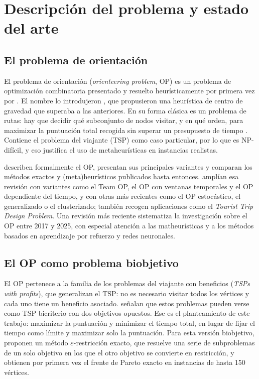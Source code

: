 \section{Descripción del problema y estado del arte}
\label{sec:estado_arte}

\subsection{El problema de orientación}

El problema de orientación (\emph{orienteering problem}, OP) es un problema de optimización combinatoria presentado y resuelto heurísticamente por primera vez por \citet{tsiligirides1984}. El nombre lo introdujeron \citet{golden1987}, que propusieron una heurística de centro de gravedad que superaba a las anteriores. En su forma clásica es un problema de rutas: hay que decidir qué subconjunto de nodos visitar, y en qué orden, para maximizar la puntuación total recogida sin superar un presupuesto de tiempo \citep{gunawan2016}. Contiene el problema del viajante (TSP) como caso particular, por lo que es NP-difícil, y eso justifica el uso de metaheurísticas en instancias realistas.

\citet{vansteenwegen2011} describen formalmente el OP, presentan sus principales variantes y comparan los métodos exactos y (meta)heurísticos publicados hasta entonces. \citet{gunawan2016} amplían esa revisión con variantes como el Team OP, el OP con ventanas temporales y el OP dependiente del tiempo, y con otras más recientes como el OP estocástico, el generalizado o el clusterizado; también recogen aplicaciones como el \emph{Tourist Trip Design Problem}. Una revisión más reciente \citep{shen2025} sistematiza la investigación sobre el OP entre 2017 y 2025, con especial atención a las matheurísticas y a los métodos basados en aprendizaje por refuerzo y redes neuronales.

\subsection{El OP como problema biobjetivo}

El OP pertenece a la familia de los problemas del viajante con beneficios (\emph{TSPs with profits}), que generalizan el TSP: no es necesario visitar todos los vértices y cada uno tiene un beneficio asociado. \citet{feillet2005} señalan que estos problemas pueden verse como TSP bicriterio con dos objetivos opuestos. Ese es el planteamiento de este trabajo: maximizar la puntuación y minimizar el tiempo total, en lugar de fijar el tiempo como límite y maximizar solo la puntuación. Para esta versión biobjetivo, \citet{berube2009} proponen un método $\varepsilon$-restricción exacto, que resuelve una serie de subproblemas de un solo objetivo en los que el otro objetivo se convierte en restricción, y obtienen por primera vez el frente de Pareto exacto en instancias de hasta 150 vértices.

